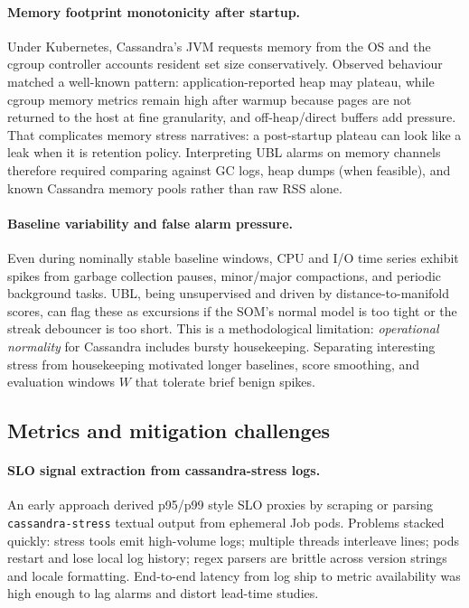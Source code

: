 \documentclass[sigconf]{acmart}
\begin{document}
\paragraph{Memory footprint monotonicity after startup.}
Under Kubernetes, Cassandra's JVM requests memory from the OS and the cgroup controller accounts resident set size conservatively. Observed behaviour matched a well-known pattern: application-reported heap may plateau, while cgroup memory metrics remain high after warmup because pages are not returned to the host at fine granularity, and off-heap/direct buffers add pressure. That complicates memory stress narratives: a post-startup plateau can look like a leak when it is retention policy. Interpreting UBL alarms on memory channels therefore required comparing against GC logs, heap dumps (when feasible), and known Cassandra memory pools rather than raw RSS alone.

\paragraph{Baseline variability and false alarm pressure.}
Even during nominally stable baseline windows, CPU and I/O time series exhibit spikes from garbage collection pauses, minor/major compactions, and periodic background tasks. UBL, being unsupervised and driven by distance-to-manifold scores, can flag these as excursions if the SOM's normal model is too tight or the streak debouncer is too short. This is a methodological limitation: \emph{operational normality} for Cassandra includes bursty housekeeping. Separating interesting stress from housekeeping motivated longer baselines, score smoothing, and evaluation windows $W$ that tolerate brief benign spikes.

%
\subsection{Metrics and mitigation challenges}
\label{subsec:challenges-metrics-mitigation}

\paragraph{SLO signal extraction from cassandra-stress logs.}
An early approach derived p95/p99 style SLO proxies by scraping or parsing \texttt{cassandra-stress} textual output from ephemeral Job pods. Problems stacked quickly: stress tools emit high-volume logs; multiple threads interleave lines; pods restart and lose local log history; regex parsers are brittle across version strings and locale formatting. End-to-end latency from log ship to metric availability was high enough to lag alarms and distort lead-time studies.
\end{document}
